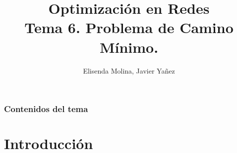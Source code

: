 \documentclass[aspectratio=169]{beamer}
\title[Optimizaci\'on en Redes] %
{ %
	\textbf{Optimizaci\'on en Redes} \\ Tema 6. Problema de Camino Mínimo.
}
\author[]{Elisenda Molina, Javier Yañez}
\institute[]
{
Universidad Complutense de Madrid\\

}
\date{}
\begin{document}

{%
\begin{frame}[plain] %
  \titlepage %
\end{frame}}


\begin{frame}
\frametitle{Contenidos del tema}
  \tableofcontents
\end{frame}

\section{Introducción}

\end{document}
